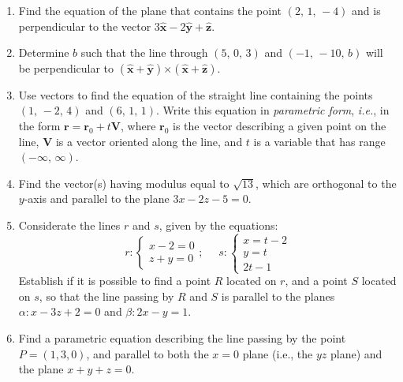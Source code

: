 \documentclass[fleqn]{article}
\begin{document}
\begin{enumerate}
  \item Find the equation of the plane that contains the point $\left(
  2,\,1,\,-4\right) $ and is perpendicular to the vector $3\mathbf{\hat{x}}-2\mathbf{\hat{y}}+\mathbf{\hat{z}}.$
  
  \item Determine $b$ such that the line through $\left( 5,\,0,\,3\right) $ and $\left( -1,\,-10,\,b\right) $ will be perpendicular to $\left( \mathbf{\hat{x}+\hat{y}}\right) \mathbf{\times }\left( \mathbf{\hat{x}+\hat{z}}\right)$.
  
  \item Use vectors to find the equation of the straight line containing the points $\left( 1,\,-2,\,4\right) $ and $\left( 6,\,1,\,1\right) .$ Write this equation in \emph{parametric form}, {\it i.e.}, in the form $\mathbf{r}= \mathbf{r}_{0}+t\mathbf{V}$, where $\mathbf{r}_{0}$ is the vector describing a given point on the line, $\mathbf{V}$ is a vector oriented along the line, and $t$ is a variable that has range $\left( -\infty ,\,\infty \right)$. 
  
  \item Find the vector(s) having modulus equal to $\sqrt{13}$, which are orthogonal to the $y$-axis and parallel to the plane $3x - 2z -5=0$.
  
  \item Considerate the lines $r$ and $s$, given by the  equations: 
  \begin{equation}
  r: 
  \begin{cases} x-2= 0 \\ z+y=0    \end{cases} ; ~~~~~~   s: \begin{cases} x = t - 2  \\ y=t \\ 2t- 1   \end{cases}   
  \end{equation}
  Establish if it is possible to find a point $R$ located on $r$, and a point $S$ located on $s$, so that the line passing by $R$ and $S$ 
  is parallel to the planes 
  $\alpha : x - 3z + 2 = 0$ and  $\beta : 2x - y = 1$.
  
  \item 
  
  Find a parametric equation describing the line passing by the point $P = (1, 3, 0)$, and parallel to both the $x=0$ plane (i.e., the $yz$ plane) and the plane $x + y + z = 0$. 
  
  \end{enumerate}
\end{document}

